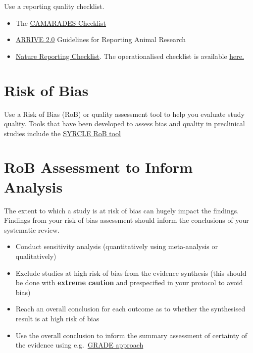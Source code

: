 \documentclass[
]{book}
\begin{document}
Use a reporting quality checklist.

\begin{itemize}
\item
  The \href{https://www.ahajournals.org/doi/pdf/10.1161/01.str.0000125719.25853.20}{CAMARADES Checklist}
\item
  \href{https://journals.plos.org/plosbiology/article?id=10.1371/journal.pbio.3000410}{ARRIVE 2.0} Guidelines for Reporting Animal Research
\item
  \href{https://media.nature.com/full/nature-assets/ncomms/authors/ncomms_lifesciences_checklist.pdf}{Nature Reporting Checklist}. The operationalised checklist is available \href{https://link.springer.com/article/10.1007/s11192-016-1964-8/tables/6}{here.}
\end{itemize}

\hypertarget{risk-of-bias}{%
\section{Risk of Bias}\label{risk-of-bias}}

Use a Risk of Bias (RoB) or quality assessment tool to help you evaluate study quality. Tools that have been developed to assess bias and quality in preclinical studies include the \href{https://bmcmedresmethodol.biomedcentral.com/track/pdf/10.1186/1471-2288-14-43}{SYRCLE RoB tool}

\hypertarget{rob-assessment-to-inform-analysis}{%
\section{RoB Assessment to Inform Analysis}\label{rob-assessment-to-inform-analysis}}

The extent to which a study is at risk of bias can hugely impact the findings. Findings from your risk of bias assessment should inform the conclusions of your systematic review.

\begin{itemize}
\item
  Conduct sensitivity analysis
  (quantitatively using meta-analysis or qualitatively)
\item
  Exclude studies at high risk of bias from the evidence synthesis
  (this should be done with \textbf{extreme caution} and prespecified in your protocol to avoid bias)
\item
  Reach an overall conclusion for each outcome as to whether the synthesised result is at high risk of bias
\item
  Use the overall conclusion to inform the summary assessment of certainty of the evidence using e.g.~\href{https://bestpractice.bmj.com/info/toolkit/learn-ebm/what-is-grade/}{GRADE approach}
\end{itemize}
\end{document}
